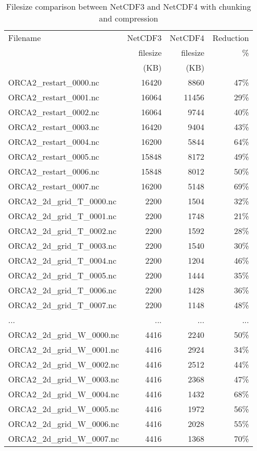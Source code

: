 \documentclass[../tex_main/NEMO_manual]{subfiles}
\begin{document}
\begin{table} \scriptsize \centering
	\begin{tabular}{lrrr}
		Filename                    & NetCDF3	& NetCDF4  & Reduction \\
                                  & filesize	& filesize & \%        \\
                                  & (KB)		& (KB)	  &           \\
		ORCA2\_restart\_0000.nc     & 16420 	& 8860 	  & 47\%      \\
		ORCA2\_restart\_0001.nc     & 16064 	& 11456    & 29\%      \\
		ORCA2\_restart\_0002.nc     & 16064		& 9744	  & 40\%      \\
		ORCA2\_restart\_0003.nc     & 16420		& 9404	  & 43\%      \\
		ORCA2\_restart\_0004.nc     & 16200 	& 5844	  & 64\%      \\
		ORCA2\_restart\_0005.nc     & 15848 	& 8172	  & 49\%      \\
		ORCA2\_restart\_0006.nc     & 15848 	& 8012 	  & 50\%      \\
		ORCA2\_restart\_0007.nc     & 16200 	& 5148 	  & 69\%      \\
		ORCA2\_2d\_grid\_T\_0000.nc & 2200 		& 1504	  & 32\%      \\
		ORCA2\_2d\_grid\_T\_0001.nc & 2200 		& 1748	  & 21\%      \\
		ORCA2\_2d\_grid\_T\_0002.nc & 2200 		& 1592	  & 28\%      \\
		ORCA2\_2d\_grid\_T\_0003.nc & 2200 		& 1540	  & 30\%      \\
		ORCA2\_2d\_grid\_T\_0004.nc & 2200 		& 1204	  & 46\%      \\
		ORCA2\_2d\_grid\_T\_0005.nc & 2200 		& 1444	  & 35\%      \\
		ORCA2\_2d\_grid\_T\_0006.nc & 2200 		& 1428	  & 36\%      \\
		ORCA2\_2d\_grid\_T\_0007.nc & 2200		& 1148	  & 48\%      \\
		...                         & ...		& ...      & ...       \\
		ORCA2\_2d\_grid\_W\_0000.nc & 4416		& 2240	  & 50\%      \\
		ORCA2\_2d\_grid\_W\_0001.nc & 4416		& 2924	  & 34\%      \\
		ORCA2\_2d\_grid\_W\_0002.nc & 4416		& 2512	  & 44\%      \\
		ORCA2\_2d\_grid\_W\_0003.nc & 4416		& 2368	  & 47\%      \\
		ORCA2\_2d\_grid\_W\_0004.nc & 4416		& 1432	  & 68\%      \\
		ORCA2\_2d\_grid\_W\_0005.nc & 4416		& 1972	  & 56\%      \\
		ORCA2\_2d\_grid\_W\_0006.nc & 4416		& 2028	  & 55\%      \\
		ORCA2\_2d\_grid\_W\_0007.nc & 4416		& 1368	  & 70\%      \\
	\end{tabular}
	\caption{
		\protect\label{tab:NC4}
		Filesize comparison between NetCDF3 and NetCDF4 with chunking and compression}
\end{table}
\end{document}
